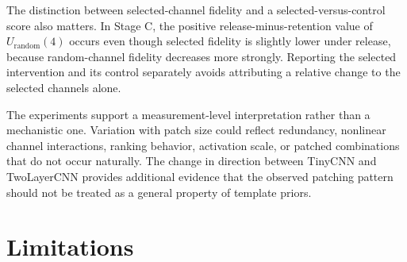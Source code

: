 \documentclass[10pt]{article}
\begin{document}
The distinction between selected-channel fidelity and a selected-versus-control score also matters. In Stage C, the positive release-minus-retention value of $U_{\mathrm{random}}(4)$ occurs even though selected fidelity is slightly lower under release, because random-channel fidelity decreases more strongly. Reporting the selected intervention and its control separately avoids attributing a relative change to the selected channels alone.

The experiments support a measurement-level interpretation rather than a mechanistic one. Variation with patch size could reflect redundancy, nonlinear channel interactions, ranking behavior, activation scale, or patched combinations that do not occur naturally. The change in direction between TinyCNN and TwoLayerCNN provides additional evidence that the observed patching pattern should not be treated as a general property of template priors.

\section{Limitations}\label{sec:limitations}
\end{document}
